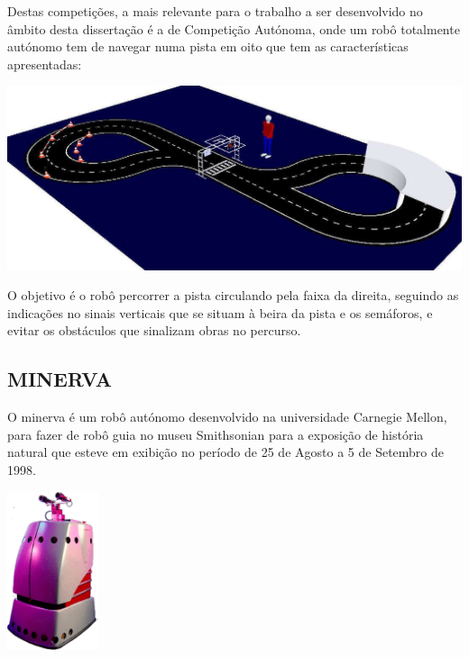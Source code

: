 Destas competições, a mais relevante para o trabalho a ser desenvolvido no 
âmbito desta dissertação é a de Competição Autónoma, onde um robô totalmente 
autónomo tem de navegar numa pista em oito que tem as características apresentadas:

\begin{center}
	\includegraphics[width=1.00\textwidth]{./figures/ca_pista.png}
	\label{fig:3}
\end{center}

O objetivo é o robô percorrer a pista circulando pela faixa da direita, seguindo
as indicações no sinais verticais que se situam à beira da pista e os semáforos,
e evitar os obstáculos que sinalizam obras no percurso.


\subsection{MINERVA}
O minerva é um robô autónomo desenvolvido na universidade Carnegie Mellon, para
fazer de robô guia no museu Smithsonian para a exposição de história natural que
esteve em exibição no período de 25 de Agosto a 5 de Setembro de 1998.

\begin{center}
	\includegraphics[width=0.20\textwidth]{./figures/minerva.png}
	\label{fig:4}
\end{center}


